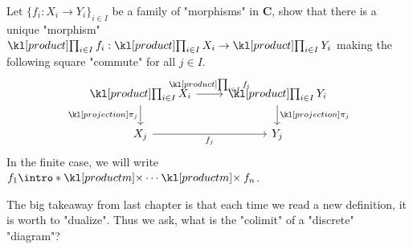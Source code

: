 \documentclass[main.tex]{subfiles}
\begin{document}
\begin{exer}[\NOW]\label{exer:limits:functionproduct}
    Let $\{f_i : X_i \rightarrow Y_i\}_{i \in I}$ be a family of "morphisms" in $\mathbf{C}$, show that there is a unique "morphism" $\Product_{i \in I} f_i: \Product_{i \in I} X_i \rightarrow\Product_{i \in I} Y_i$ making the following square "commute" for all $j \in I$.
    \begin{equation}\label{diag:prodmorph}
        \begin{tikzcd}
            {\Product_{i \in I} X_i} & {\Product_{i \in I} Y_i} \\
            {X_j} & {Y_j}
            \arrow["{\Product_{i \in I} f_i}", from=1-1, to=1-2]
            \arrow["{\projection_j}", from=1-2, to=2-2]
            \arrow["{\projection_j}"', from=1-1, to=2-1]
            \arrow["{f_j}"', from=2-1, to=2-2]
        \end{tikzcd}
    \end{equation}
    \AP In the finite case, we will write $f_1 \intro*\productm \cdots \productm f_n$.
\end{exer}

The big takeaway from last chapter is that each time we read a new definition, it is worth to "dualize". Thus we ask, what is the "colimit" of a "discrete" "diagram"?
\end{document}
